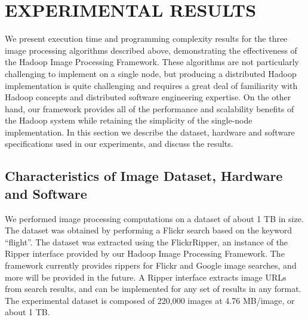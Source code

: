 \documentclass{osuthesis}
\begin{document}
				
				\chapter{EXPERIMENTAL RESULTS}
				We present execution time and programming complexity results for the
				three image processing algorithms described above, demonstrating the
				effectiveness of the Hadoop Image Processing Framework.  These
				algorithms are not particularly challenging to implement on a single
				node, but producing a distributed Hadoop implementation is quite
				challenging and requires a great deal of familiarity with Hadoop
				concepts and distributed software engineering expertise.  On the other
				hand, our framework provides all of the performance and scalability
				benefits of the Hadoop system while retaining the simplicity of the
				single-node implementation.  In this section we describe the dataset, 
				hardware and software specifications used in our experiments, and
				discuss the results.
				
				
				
				\section{Characteristics of Image Dataset, Hardware and Software}
				We performed image processing computations on a dataset of about 1 TB
				in size. The dataset was obtained by performing a Flickr search based
				on the keyword ``flight''.  The dataset was extracted using the
				FlickrRipper, an instance of the Ripper interface provided by our
				Hadoop Image Processing Framework.  The framework currently provides
				rippers for Flickr and Google image searches, and more will be
				provided in the future.  A Ripper interface extracts image URLs from
				search results, and can be implemented for any set of results in any
				format.  The experimental dataset is composed of 220,000 images at 4.76
				MB/image, or about 1 TB.
				
\end{document}
